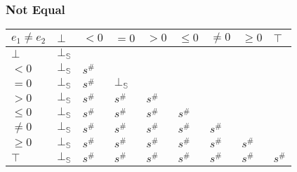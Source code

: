 \documentclass{beamer}
\begin{document}
\begin{frame}
    \frametitle{Not Equal}
\begin{table}
    \begin{tabular}{|l|l|l|l|l|l|l|l|l|}
    \hline
    $e_1 \ne e_2$ & $\bot$ & $<0$   & $=0$   & $>0$   & $\le 0$ & $\ne 0$ & $\ge 0$ & $\top$ \\ \hline
    $\bot$        & $\bot_\mathbb{S}$ &        &        &        &         &         &         &        \\ \hline
    $<0$          & $\bot_\mathbb{S}$ & $s^\#$ &        &        &         &         &         &        \\ \hline
    $=0$          & $\bot_\mathbb{S}$ & $s^\#$ & $\bot_\mathbb{S}$ &        &         &         &         &        \\ \hline
    $>0$          & $\bot_\mathbb{S}$ & $s^\#$ & $s^\#$ & $s^\#$ &         &         &         &        \\ \hline
    $\le 0$       & $\bot_\mathbb{S}$ & $s^\#$ & $s^\#$ & $s^\#$ & $s^\#$  &         &         &        \\ \hline
    $\ne 0$       & $\bot_\mathbb{S}$ & $s^\#$ & $s^\#$ & $s^\#$ & $s^\#$  & $s^\#$  &         &        \\ \hline
    $\ge 0$       & $\bot_\mathbb{S}$ & $s^\#$ & $s^\#$ & $s^\#$ & $s^\#$  & $s^\#$  & $s^\#$  &        \\ \hline
    $\top$        & $\bot_\mathbb{S}$ & $s^\#$ & $s^\#$ & $s^\#$ & $s^\#$  & $s^\#$  & $s^\#$  & $s^\#$ \\ \hline
    \end{tabular}
    \end{table}
\end{frame}
\end{document}
